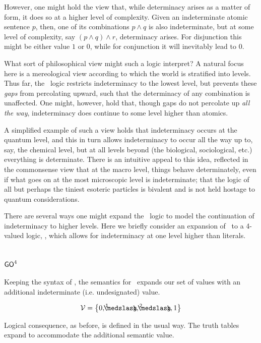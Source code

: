However, one might hold the view that, while determinacy arises as a matter of form, it does so at a higher level of complexity. Given an indeterminate atomic sentence $p$, then, one of its combinations $p \wedge q$ is also indeterminate, but at some level of complexity, say $(p \wedge q) \wedge r$, determinacy arises. For disjunction this might be either value $1$ or $0$, while for conjunction it will inevitably lead to $0$.

What sort of philosophical view might such a logic interpret? A natural focus here is a mereological view according to which the world is stratified into levels. Thus far, the \GO\ logic restricts indeterminacy to the lowest level, but prevents these \emph{gaps} from percolating upward, such that the determinacy of any combination is unaffected. One might, however, hold that, though gaps do not percolate up \emph{all the way}, indeterminacy does continue to some level higher than atomics.

A simplified example of such a view holds that indeterminacy occurs at the quantum level, and this in turn allows indeterminacy to occur all the way up to, say, the chemical level, but at all levels beyond (the biological, sociological, etc.) everything is determinate. There is an intuitive appeal to this idea, reflected in the commonsense view that at the macro level, things behave determinately, even if what goes on at the most microscopic level is indeterminate; that the logic of all but perhaps the tiniest esoteric particles is bivalent and is not held hostage to quantum considerations.

There are several ways one might expand the \GO\ logic to model the continuation of indeterminacy to higher levels. Here we briefly consider an expansion of \GO\ to a 4-valued logic, \GoFour, which allows for indeterminacy at one level higher than literals. 

\section{$\mathsf{GO}^4$}\label{goFour}

Keeping the syntax of \GO, the semantics for \GoFour\ expands our set of values with an additional indeterminate (i.e. undesignated) value. 

\[ \Values = \set{ 0, \oneThird, \twoThirds, 1} \]

\noindent Logical consequence, as before, is defined in the usual way. The truth tables expand to accommodate the additional semantic value.

